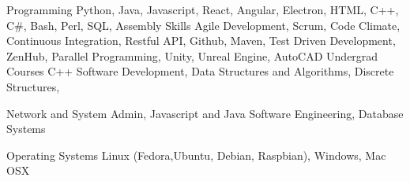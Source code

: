 \vspace{-1.2\baselineskip}
\newcommand\addSpace[1]{#1\hfill}

\begin{cvskills}
  \cvskill
    {Programming}   %
	{Python, Java, Javascript, React, Angular, Electron, HTML, C++, C#, Bash, Perl, SQL, Assembly}
  \cvskill
   {Skills}   %
	{Agile Development, Scrum, Code Climate, Continuous Integration, Restful API, Github, Maven,}
\cvskill
 {}
 {Test Driven Development, ZenHub, Parallel Programming, Unity, Unreal Engine, AutoCAD}
  \cvskill
    {Undergrad Courses}  %
	{C++ Software Development, Data Structures and Algorithms, Discrete Structures,}

  \cvskill
    {}   %
	{Network and System Admin, Javascript and Java Software Engineering, Database Systems}
	

  \cvskill
    {Operating Systems}  %
	{Linux (Fedora,Ubuntu, Debian, Raspbian), Windows, Mac OSX}
	
\end{cvskills}
\vspace{-.7\baselineskip}

